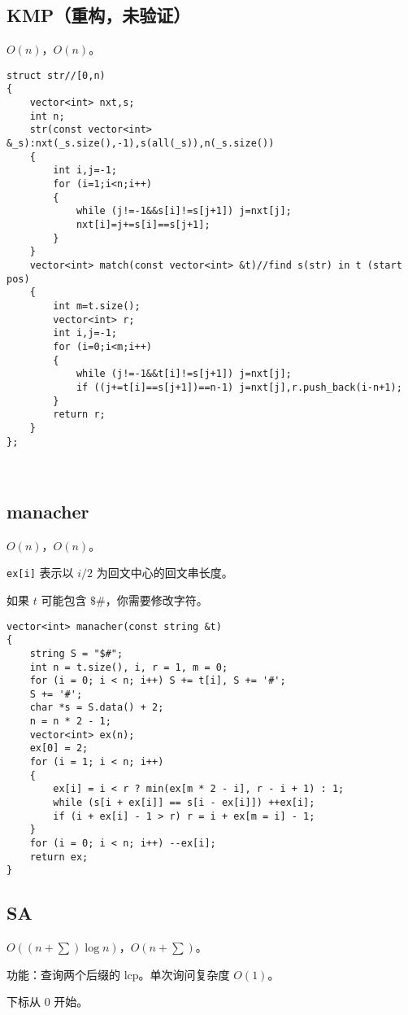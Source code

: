 \documentclass[12pt]{ctexart}
\begin{document}
\subsection{KMP（重构，未验证）}

$O(n)$，$O(n)$。

\begin{lstlisting}
struct str//[0,n)
{
	vector<int> nxt,s;
	int n;
	str(const vector<int> &_s):nxt(_s.size(),-1),s(all(_s)),n(_s.size())
	{
		int i,j=-1;
		for (i=1;i<n;i++)
		{
			while (j!=-1&&s[i]!=s[j+1]) j=nxt[j];
			nxt[i]=j+=s[i]==s[j+1];
		}
	}
	vector<int> match(const vector<int> &t)//find s(str) in t (start pos)
	{
		int m=t.size();
		vector<int> r;
		int i,j=-1;
		for (i=0;i<m;i++)
		{
			while (j!=-1&&t[i]!=s[j+1]) j=nxt[j];
			if ((j+=t[i]==s[j+1])==n-1) j=nxt[j],r.push_back(i-n+1);
		}
		return r;
	}
};

	
\end{lstlisting}

\subsection{manacher}

$O(n)$，$O(n)$。

\verb|ex[i]| 表示以 $i/2$ 为回文中心的回文串长度。

如果 $t$ 可能包含 $\texttt{\$\#}$，你需要修改字符。

\begin{lstlisting}
vector<int> manacher(const string &t)
{
	string S = "$#";
	int n = t.size(), i, r = 1, m = 0;
	for (i = 0; i < n; i++) S += t[i], S += '#';
	S += '#';
	char *s = S.data() + 2;
	n = n * 2 - 1;
	vector<int> ex(n);
	ex[0] = 2;
	for (i = 1; i < n; i++)
	{
		ex[i] = i < r ? min(ex[m * 2 - i], r - i + 1) : 1;
		while (s[i + ex[i]] == s[i - ex[i]]) ++ex[i];
		if (i + ex[i] - 1 > r) r = i + ex[m = i] - 1;
	}
	for (i = 0; i < n; i++) --ex[i];
	return ex;
}
\end{lstlisting}

\subsection{SA}

$O((n+\sum)\log n)$，$O(n+\sum)$。

功能：查询两个后缀的 lcp。单次询问复杂度 $O(1)$。

下标从 $0$ 开始。
\end{document}
